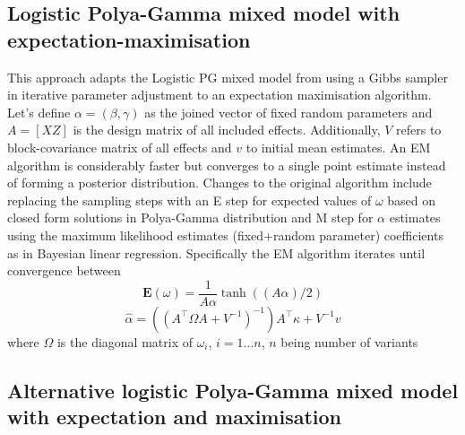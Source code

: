 \documentclass [12pt,a4paper]{report}
\begin{document}
\vline
\subsection*{Logistic Polya-Gamma mixed model with expectation-maximisation}

This approach adapts the Logistic PG mixed model  from using a Gibbs sampler in iterative parameter adjustment to an expectation maximisation algorithm. Let's define $\alpha=(\beta,\gamma)$ as the joined vector of fixed random parameters and $A=[XZ]$ is the design matrix of all included effects. Additionally, $V$ refers to block-covariance matrix of all effects and $v$ to initial mean estimates. An EM algorithm is considerably faster but converges to a single point estimate instead of forming a posterior distribution.  Changes to the original algorithm include replacing the sampling steps with an E step for expected values of $\omega$ based on closed form solutions in Polya-Gamma distribution and M step for $\alpha$ estimates using the maximum likelihood estimates (fixed+random parameter) coefficients as in Bayesian linear regression. Specifically the EM algorithm iterates until convergence between \[\mathbf{E}(\omega)=\frac{1}{A\alpha}\tanh((A\alpha)/2)\] 
 \[ \hat{\alpha}=((A^{\intercal} \Omega A + V^{-1})^{-1}) A^{\intercal}\kappa+V^{-1}v  \] where $\Omega$ is the diagonal matrix of $\omega_i$, $ i=1 \ldots n$, $n$ being number of variants \par 
 

\subsection*{Alternative logistic Polya-Gamma mixed model with expectation and maximisation}
\end{document}
